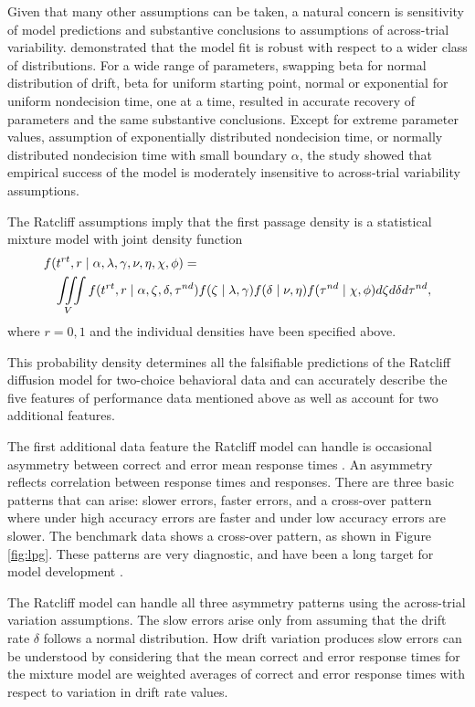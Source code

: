 \documentclass[12pt]{report}
\begin{document}
Given that many other assumptions can be taken, a natural concern is sensitivity of model predictions and substantive conclusions to assumptions of across-trial variability.
\citep{Rat2013} demonstrated that the model fit is robust with
respect to a wider class of distributions. For a wide range of parameters, swapping beta for normal distribution of drift, beta for uniform starting point, normal or exponential for uniform nondecision time, one at a time, resulted in accurate recovery of parameters and the same substantive conclusions. Except for extreme parameter values, assumption of exponentially distributed nondecision time, or normally distributed nondecision time with small boundary $\alpha$, the study showed that empirical success of the model is moderately insensitive to across-trial variability assumptions. 

The Ratcliff assumptions imply that the first passage density is a
statistical mixture model with joint density function
%
\begin{eqnarray}
\label{eqn:mixture}
\lefteqn{f(t^{rt}, r \mid \alpha, \lambda, \gamma, \nu, \eta, \chi, \phi) =} \\ 
& & \iiint\limits_V f(t^{rt}, r \mid \alpha, \zeta, \delta, \tau^{nd})f(\zeta \mid \lambda, \gamma)f(\delta \mid \nu, \eta)f(\tau^{nd} \mid \chi, \phi)d\zeta d\delta d\tau^{nd} \nonumber,
\end{eqnarray}
%
where $r=0,1$ and the individual densities have been specified above.

This probability density determines all the falsifiable predictions
of the Ratcliff diffusion model for two-choice behavioral data and can
accurately describe the five features of performance data mentioned above as well as account for two additional features\citep{RatTue2002, Rat2002}. 

The first additional data feature the Ratcliff model can handle is occasional asymmetry between correct and error mean response times \citep{RatMck2008, Wag2009}. An asymmetry reflects correlation between response times and responses. There are three basic patterns that can arise: slower errors, faster errors, and a cross-over pattern where under high accuracy errors are faster and under low accuracy errors are slower. The benchmark data shows a cross-over pattern, as shown in Figure \ref{fig:lpg}. These patterns are very diagnostic, and have been a long target for model development \citep{Lam1968,Rat1978,Vic1979,RatRou1998}.

The Ratcliff model can handle all three asymmetry patterns using the across-trial variation assumptions. The slow errors arise only from assuming that the drift rate $\delta$ follows a normal distribution. How drift variation produces slow errors can be understood by considering that the mean correct and error response times for the mixture model are weighted averages of correct and error response times with respect to variation in drift rate values. 
\end{document}
